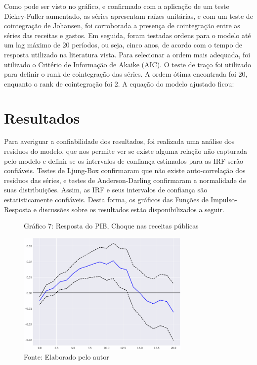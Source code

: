 \documentclass[a4paper, 12pt, openany, oneside, brazil]{abntex2}
\begin{document}
Como pode ser visto no gráfico, e confirmado com a aplicação de um teste Dickey-Fuller aumentado, as séries apresentam raízes unitárias, e com um teste de cointegração de Johansen, foi corroborada a presença de cointegração entre as séries das receitas e gastos. Em seguida, foram testadas ordens para o modelo até um lag máximo de 20 períodos, ou seja, cinco anos, de acordo com o tempo de resposta utilizado na literatura vista. Para selecionar a ordem mais adequada, foi utilizado o Critério de Informação de Akaike (AIC). O teste de traço foi utilizado para definir o rank de cointegração das séries. A ordem ótima encontrada foi 20, enquanto o rank de cointegração foi 2. A equação do modelo ajustado ficou: 


%
%
\chapter{Resultados}
Para averiguar a confiabilidade dos resultados, foi realizada uma análise dos resíduos do modelo, que nos permite ver se existe alguma relação não capturada pelo modelo e definir se os intervalos de confiança estimados para as IRF serão confiáveis. Testes de Ljung-Box confirmaram que não existe auto-correlação dos resíduos das séries, e testes de Anderson-Darling confirmaram a normalidade de suas distribuições. Assim, as IRF e seus intervalos de confiança são estatisticamente confiáveis. Desta forma, os gráficos das Funções de Impulso-Resposta e discussões sobre os resultados estão disponibilizados a seguir.


\begin{figure}[h!]
	\caption*{Gráfico 7: Resposta do PIB, Choque nas receitas públicas}
	\includegraphics[width=0.75\textwidth]{resultados/irf_revenue_gdp}
	\caption*{Fonte: Elaborado pelo autor}
\end{figure}
\end{document}

